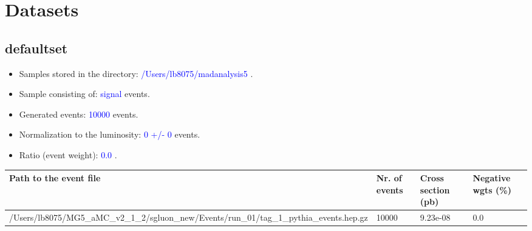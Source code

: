 \documentclass[a4paper, 11pt]{article}
\begin{document}
\section{ Datasets}

\subsection{ defaultset}

\begin{itemize}
  \item Samples stored in the directory: \textcolor{blue}{/\-Users/\-lb8075/\-madanalysis5} .
   \item Sample consisting of: \textcolor{blue}{signal}  events.
   \item Generated events: \textcolor{blue}{10000 }  events.
   \item Normalization to the luminosity: \textcolor{blue}{0}\textcolor{blue}{ +/\-- }\textcolor{blue}{0 }  events.
   \item Ratio (event weight): \textcolor{blue}{0.0 } .  
 
\end{itemize}
\begin{table}[!h]
  \begin{center}
    \begin{tabular}{|m{51.0mm}|m{24.0mm}|m{28.0mm}|m{28.0mm}|}
      \hline
      \cellcolor{yellow}         Path to the event file& \cellcolor{yellow}         Nr. of events& \cellcolor{yellow}         Cross section (pb)& \cellcolor{yellow}         Negative wgts (\%)\\
      \hline
      \cellcolor{white}          /\-Users/\-lb8075/\-MG5\_aMC\_v2\_1\_2/\-sgluon\_new/\-Events/\-run\_01/\-tag\_1\_pythia\_events.hep.gz& \cellcolor{white}          10000& \cellcolor{white}          9.23e-08& \cellcolor{white}          0.0\\
\hline
    \end{tabular}
  \end{center}
\end{table}
\end{document}
